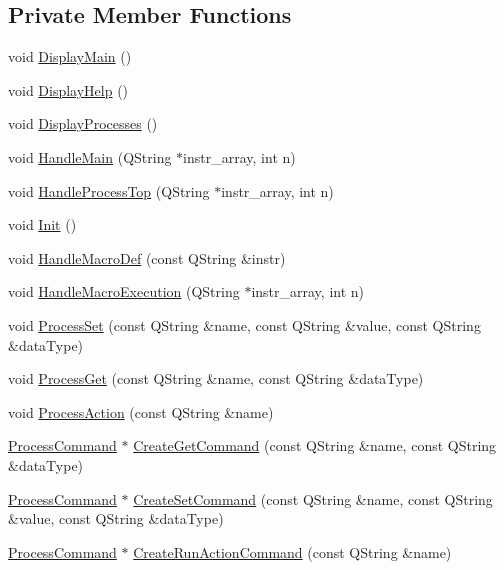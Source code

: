 \subsection*{\-Private \-Member \-Functions}
\begin{DoxyCompactItemize}
\item 
void \hyperlink{classGRICLI_aca8db115606e75236a95dfb0d5146a0f}{\-Display\-Main} ()
\item 
void \hyperlink{classGRICLI_af81933db339377109871b85301bade63}{\-Display\-Help} ()
\item 
void \hyperlink{classGRICLI_ad1e1cd6f97c3e292865a6d82bea2d5b2}{\-Display\-Processes} ()
\item 
void \hyperlink{classGRICLI_a7f18b3d8d774f28264fe0d6013181e40}{\-Handle\-Main} (\-Q\-String $\ast$instr\-\_\-array, int n)
\item 
void \hyperlink{classGRICLI_aacdb93fd3aa84ed7f34a60ed23633cb8}{\-Handle\-Process\-Top} (\-Q\-String $\ast$instr\-\_\-array, int n)
\item 
void \hyperlink{classGRICLI_a2bdf0e3ff63cc8eb5b6797e715e33929}{\-Init} ()
\item 
void \hyperlink{classGRICLI_a8889ab59706fd5ed470840f0b126ed4f}{\-Handle\-Macro\-Def} (const \-Q\-String \&instr)
\item 
void \hyperlink{classGRICLI_a11dce2aefbf1502f5cddfb9d847bfd5b}{\-Handle\-Macro\-Execution} (\-Q\-String $\ast$instr\-\_\-array, int n)
\item 
void \hyperlink{classGRICLI_a1815d632d67a992addc93e2acdc52075}{\-Process\-Set} (const \-Q\-String \&name, const \-Q\-String \&value, const \-Q\-String \&data\-Type)
\item 
void \hyperlink{classGRICLI_a73efea538a8f8dfeefc8887446174e90}{\-Process\-Get} (const \-Q\-String \&name, const \-Q\-String \&data\-Type)
\item 
void \hyperlink{classGRICLI_adeef08c8941fab8988315f673b4fa7b6}{\-Process\-Action} (const \-Q\-String \&name)
\item 
\hyperlink{structProcessCommand}{\-Process\-Command} $\ast$ \hyperlink{classGRICLI_a3b2c17c5a1b9fd19455e07d336b3c5b0}{\-Create\-Get\-Command} (const \-Q\-String \&name, const \-Q\-String \&data\-Type)
\item 
\hyperlink{structProcessCommand}{\-Process\-Command} $\ast$ \hyperlink{classGRICLI_a4b0b181e1dad96c764ed7389cc604447}{\-Create\-Set\-Command} (const \-Q\-String \&name, const \-Q\-String \&value, const \-Q\-String \&data\-Type)
\item 
\hyperlink{structProcessCommand}{\-Process\-Command} $\ast$ \hyperlink{classGRICLI_aed09a0a961861bdd5c7f0c0c98f22518}{\-Create\-Run\-Action\-Command} (const \-Q\-String \&name)
\end{DoxyCompactItemize}
